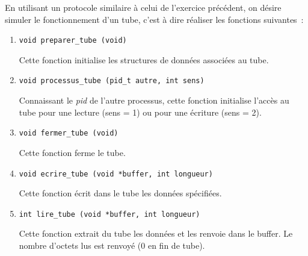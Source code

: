 \question

En utilisant un protocole similaire à celui de l'exercice précédent,
on désire simuler le fonctionnement d'un tube, c'est à dire réaliser
les fonctions suivantes~:

\begin {enumerate}
    \item \verb:void preparer_tube (void):

	Cette fonction initialise les structures de données associées
	au tube.

    \item \verb:void processus_tube (pid_t autre, int sens):

	Connaissant le \textit {pid} de l'autre processus, cette
	fonction initialise l'accès au tube pour une lecture (sens
	= 1) ou pour une écriture (sens = 2).

    \item \verb:void fermer_tube (void):

	Cette fonction ferme le tube.

    \item \verb:void ecrire_tube (void *buffer, int longueur):

	Cette fonction écrit dans le tube les données spécifiées.

    \item \verb:int lire_tube (void *buffer, int longueur):

	Cette fonction extrait du tube les données et les renvoie
	dans le buffer. Le nombre d'octets lus est renvoyé (0 en
	fin de tube).

\end {enumerate}



